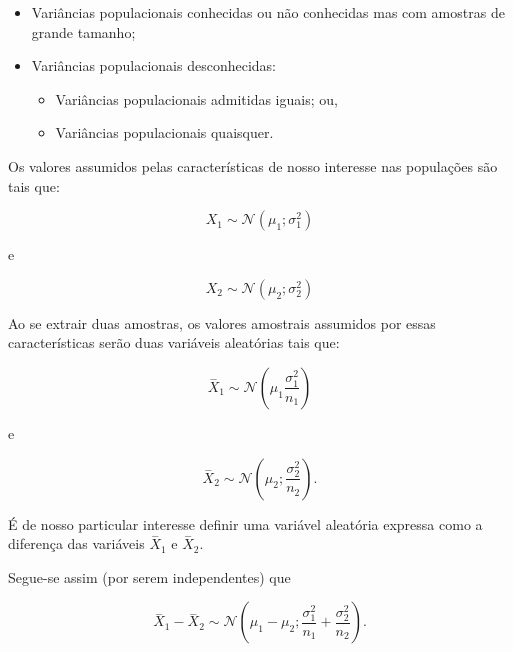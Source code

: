 \documentclass[
]{book}
\providecommand{\tightlist}{%
  \setlength{\itemsep}{0pt}\setlength{\parskip}{0pt}}
\begin{document}
\hfill\break

\begin{itemize}
\tightlist
\item
  Variâncias populacionais conhecidas ou não conhecidas mas com amostras de grande tamanho;\\
\item
  Variâncias populacionais desconhecidas:

  \begin{itemize}
  \tightlist
  \item
    Variâncias populacionais admitidas iguais; ou,\\
  \item
    Variâncias populacionais quaisquer.
  \end{itemize}
\end{itemize}

\hfill\break

Os valores assumidos pelas características de nosso interesse nas populações são tais que:

\hfill\break

\[
X_{1} \sim \mathcal{N}(\mu_{1}; \sigma^{2}_{1})
\]

\hfill\break

e

\hfill\break

\[
X_{2} \sim \mathcal{N}(\mu_{2}; \sigma^{2}_{2})
\]

Ao se extrair duas amostras, os valores amostrais assumidos por essas características serão duas variáveis aleatórias tais que:

\hfill\break

\[
\stackrel{-}{X}_{1} \sim \mathcal{N} (\mu_{1}\frac{\sigma^{2}_{1}}{n_{1}}) 
\]

\hfill\break

e

\hfill\break

\[
\stackrel{-}{X}_{2} \sim \mathcal{N} (\mu_{2};\frac{\sigma^{2}_{2}}{n_{2}}).
\]

\hfill\break

É de nosso particular interesse definir uma variável aleatória expressa como a diferença das variáveis \(\stackrel{-}{X}_{1}\) e \(\stackrel{-}{X}_{2}\).

\hfill\break
Segue-se assim (por serem independentes) que

\hfill\break

\[
\stackrel{-}{X}_{1}-\stackrel{-}{X}_{2}  \sim \mathcal{N} (\mu_{1}-\mu_{2}; \frac{\sigma^{2}_{1}}{n_{1}} +  \frac{\sigma^{2}_{2}}{n_{2}}) .
\]
\end{document}
